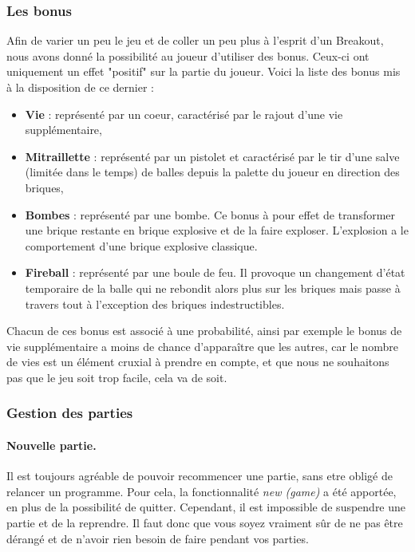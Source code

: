 \documentclass[a4paper,10pt]{article}
\begin{document}
    \subsubsection{Les bonus}
        Afin de varier un peu le jeu et de coller un peu plus à l'esprit d'un Breakout, nous avons donné la possibilité au joueur
        d'utiliser des bonus. Ceux-ci ont uniquement un effet "positif" sur la partie du joueur. Voici la liste des bonus mis
        à la disposition de ce dernier :
        \begin{itemize}
            \item \textbf{Vie} : représenté par un coeur, caractérisé par le rajout d'une vie supplémentaire,
            \item \textbf{Mitraillette} : représenté par un pistolet et caractérisé par le tir d'une salve (limitée dans le temps)
            de balles depuis la palette du joueur en direction des briques,
            \item \textbf{Bombes} : représenté par une bombe. Ce bonus à pour effet de transformer une brique restante
            en brique explosive et de la faire exploser. L'explosion a le comportement d'une brique explosive classique.
            \item \textbf{Fireball} : représenté par une boule de feu. Il provoque un changement d'état temporaire de la balle
            qui ne 	rebondit alors plus sur les briques mais passe à travers tout à l'exception des briques indestructibles. \\
        \end{itemize}

        Chacun de ces bonus est associé à une probabilité, ainsi  par exemple le bonus de vie supplémentaire a moins
        de chance d'apparaître que les autres, car le nombre de vies est un élément cruxial à prendre
        en compte, et que nous ne souhaitons pas que le jeu soit trop facile, cela va de soit.

    \subsubsection{Gestion des parties}

       	\paragraph{Nouvelle partie.} Il est toujours agréable de pouvoir recommencer une partie, sans etre obligé de relancer un
        programme. Pour cela, la fonctionnalité \textit{new (game)} a été apportée, en plus de la
        possibilité de quitter. Cependant, il est impossible de suspendre une partie et de la reprendre.
        Il faut donc que vous soyez vraiment sûr de ne pas être dérangé et de n'avoir rien besoin de faire pendant vos parties.
\end{document}
